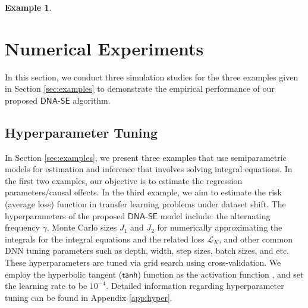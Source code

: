 \documentclass{article}
\def\dnase{{\mathsf{DNA\mbox{-}SE}}}
\def\tanh{\mathsf{tanh}}
\theoremstyle{plain}
\theoremstyle{definition}
\newtheorem{example}[theorem]{Example}
\theoremstyle{remark}
\newtheorem{remark}[theorem]{Remark}
\def\hat{\widehat}
\begin{document}
\begin{example}

\label{eg:shift}
\end{example}

\section{Numerical Experiments}
\label{sec:sim}
In this section, we conduct three simulation studies for the three examples given in Section \ref{sec:examples} to demonstrate the empirical performance of our proposed $\dnase$ algorithm.

\subsection{Hyperparameter Tuning}
\label{sec:Tuning}

In Section \ref{sec:examples}, we present three examples that use semiparametric models for estimation and inference that involves solving integral equations. In the first two examples, our objective is to estimate the regression parameters/causal effects. In the third example, we aim to estimate the risk (average loss) function in transfer learning problems under dataset shift. The hyperparameters of the proposed $\dnase$ model include: the alternating frequency $\gamma$, Monte Carlo sizes $J_1$ and $J_2$ for numerically approximating the integrals for the integral equations and the related loss $\mathcal{L}_{K}$, and other common DNN tuning parameters such as depth, width, step sizes, batch sizes, and etc. These hyperparameters are tuned via grid search using cross-validation. We employ the hyperbolic tangent ($\tanh$) function as the activation function \citep{lu2022machine}, and set the learning rate to be $10^{-4}$. Detailed information regarding hyperparameter tuning can be found in Appendix \ref{app:hyper}.
\end{document}
